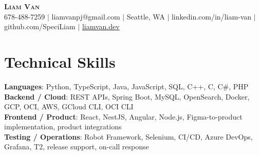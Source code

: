 \documentclass[letterpaper,11pt]{article}
\begin{document}

%
\begin{center}
    \textbf{\Huge \scshape Liam Van} \\ \vspace{1pt}
    \small 678-488-7259 $|$ liamvanpj@gmail.com $|$ Seattle, WA $|$
    linkedin.com/in/liam-van $|$ github.com/SpeciLiam $|$ \href{https://liamvan.dev}{liamvan.dev}

\end{center}

\section{Technical Skills}
 \begin{itemize}[leftmargin=0.15in, label={}]
    \small{\item{
     \textbf{Languages}{: Python, TypeScript, Java, JavaScript, SQL, C++, C, C\#, PHP} \\
     \textbf{Backend / Cloud}{: REST APIs, Spring Boot, MySQL, OpenSearch, Docker, GCP, OCI, AWS, GCloud CLI, OCI CLI} \\
     \textbf{Frontend / Product}{: React, NestJS, Angular, Node.js, Figma-to-product implementation, product integrations} \\
     \textbf{Testing / Operations}{: Robot Framework, Selenium, CI/CD, Azure DevOps, Grafana, T2, release support, on-call response} \\
    }}
 \end{itemize}
%

\end{document}
